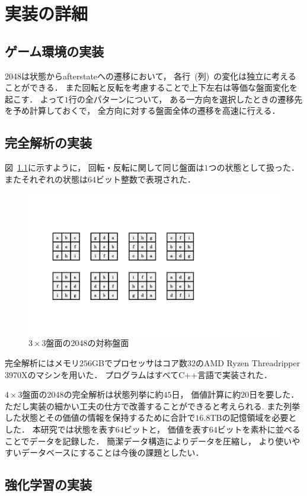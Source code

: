 \chapter{実装の詳細}

\section{ゲーム環境の実装}
\label{sec:game_impl}
2048は状態からafterstateへの遷移において， 各行~(列)~の変化は独立に考えることができる．
また回転と反転を考慮することで上下左右は等価な盤面変化を起こす．
よって$1$行の全パターンについて， ある一方向を選択したときの遷移先を予め計算しておくで， 全方向に対する盤面全体の遷移を高速に行える．

\section{完全解析の実装}
\label{sec:solving_impl}
図~\ref{fig:symmtric_boards}に示すように， 回転・反転に関して同じ盤面は$1$つの状態として扱った．
またそれぞれの状態は$64$ビット整数で表現された．
\begin{figure}[t]
    \centering
    \includegraphics[width=0.6\linewidth{}]{figures/symmetric.pdf}
    \caption{$3\times3$盤面の2048の対称盤面}
    \label{fig:symmtric_boards}
\end{figure}
完全解析にはメモリ$256$GBでプロセッサはコア数$32$のAMD Ryzen Threadripper 3970Xのマシンを用いた．
プログラムはすべてC++言語で実装された．

$4\times3$盤面の2048の完全解析は状態列挙に約$45$日， 価値計算に約$20$日を要した．
ただし実装の細かい工夫の仕方で改善することができると考えられる.
また列挙した状態とその価値の情報を保持するために合計で$16.8$TBの記憶領域を必要とした．
本研究では状態を表す$64$ビットと， 価値を表す$64$ビットを素朴に並べることでデータを記録した．
簡潔データ構造によりデータを圧縮し， より使いやすいデータベースにすることは今後の課題としたい．

\section{強化学習の実装}
